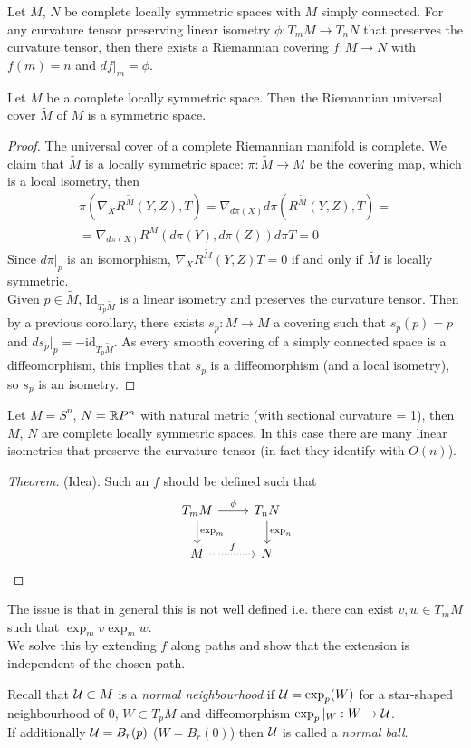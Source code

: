 \documentclass[10pt,a4paper]{article}
\begin{document}
\begin{theorem}
Let $M$, $N$ be complete locally symmetric spaces with $M$ simply connected. For any curvature tensor preserving linear isometry $\phi:T_mM\to T_nN$ that preserves the curvature tensor, then there exists a Riemannian covering $f:M\to N$ with $f(m)=n$ and $df\vert_m = \phi$.
\end{theorem}
\begin{corollary}
Let $M$ be a complete locally symmetric space. Then the Riemannian universal cover $\tilde{M}$ of $M$ is a symmetric space.
\end{corollary}
\begin{proof}
The universal cover of a complete Riemannian manifold is complete. We claim that $\tilde{M}$ is a locally symmetric space: $\pi:\tilde{M}\to M$ be the covering map, which is a local isometry, then 
\begin{multline*}
\pi(\nabla_X R^{\tilde{M}}(Y,Z),T) = \nabla_{d\pi(X)}d\pi(R^{\tilde{M}}(Y,Z),T) = \\
=\nabla_{d\pi(X)}R^M(d\pi(Y),d\pi(Z))d\pi T = 0
\end{multline*}
Since $d\pi\vert_p$ is an isomorphism, $\nabla_X R^{\tilde{M}}(Y,Z)T=0$ if and only if $\tilde{M}$ is locally symmetric.\\
Given $p\in \tilde{M}$, $\text{Id}_{T_p\tilde{M}}$ is a linear isometry and preserves the curvature tensor. Then by a previous corollary, there exists $s_p:\tilde{M}\to \tilde{M}$ a covering such that $s_p(p)=p$ and $ds_p\vert_p = -\text{id}_{T_p\tilde{M}}$. As every smooth covering of a simply connected space is a diffeomorphism, this implies that $s_p$ is a diffeomorphism (and a local isometry), so $s_p$ is an isometry.
\end{proof}
\begin{example}
Let $M=S^n$, $N=\mathbb{R} P^n$ with natural metric (with sectional curvature = 1), then $M$, $N$ are complete locally symmetric spaces. In this case there are many linear isometries that preserve the curvature tensor (in fact they identify with $O(n)$).
\end{example}
\begin{proof}[Theorem]
(Idea).  Such an $f$ should be defined such that 
\[\begin{tikzcd}
T_m M \arrow{r}{\phi} \arrow{d}{\exp_m} & T_nN \arrow{d}{\exp_n}\\
M \arrow[r, dotted, "f"] &N
\end{tikzcd}\]
\end{proof}
The issue is that in general this is not well defined i.e. there can exist $v,w\in T_m M$ such that $\exp_m v  \exp_m w$.\\
We solve this by extending $f$ along paths and show that the extension is independent of the chosen path.
\begin{remark}
Recall that $\mathcal{U}\subset M$ is a \textit{normal neighbourhood} if $\mathcal{U} = \exp_p(W)$ for a star-shaped neighbourhood of 0, $W\subset T_p M$ and diffeomorphism $\exp_p\vert_W:W\to \mathcal{U}$. \\
If additionally $\mathcal{U} = B_r(p)$ ($W = B_r(0)$) then $\mathcal{U}$ is called a \textit{normal ball}.
\end{remark}
\end{document}
